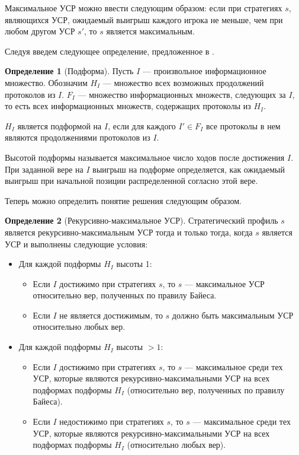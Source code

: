 \documentclass{mipt-thesis-bs}
\theoremstyle{plain}
\theoremstyle{definition}
\newtheorem{definition}{Определение}
\begin{document}
Максимальное УСР можно ввести следующим образом: если при стратегиях $s$, являющихся УСР, ожидаемый выигрыш каждого игрока не меньше, чем при любом другом УСР $s'$, то $s$ является максимальным.

Следуя \cite{chen2017noncoop} введем следующее определение, предложенное в \cite{kreps1982sequential}.
\begin{definition}[Подформа]
    Пусть $I$ --- произвольное информационное множество. Обозначим $H_I$ --- множество всех возможных продолжений протоколов из $I$. $F_I$ --- множество информационных множеств, следующих за $I$, то есть всех информационных множеств, содержащих протоколы из $H_I$.

    $H_I$ является подформой на $I$, если для каждого $I' \in F_I$ все протоколы в нем являются продолжениями протоколов из $I$.

    Высотой подформы называется максимальное число ходов после достижения $I$. При заданной вере на $I$ выигрыш на подформе определяется, как ожидаемый выигрыш при начальной позиции распределенной согласно этой вере.
\end{definition}

Теперь можно определить понятие решения следующим образом.

\begin{definition}[Рекурсивно-максимальное УСР]
   Стратегический профиль $s$ является рекурсивно-максимальным УСР тогда и только тогда, когда $s$ является УСР и выполнены следующие условия:
   \begin{itemize}
       \item Для каждой подформы $H_I$ высоты 1:
           \begin{itemize}
               \item Если $I$ достижимо при стратегиях $s$, то $s$ --- максимальное УСР относительно вер, полученных по правилу Байеса.
               \item Если $I$ не является достижимым, то $s$ должно быть максимальным УСР относительно любых вер.
            \end{itemize}
        \item Для каждой подформы $H_I$ высоты $>1$:
            \begin{itemize}
                \item Если $I$ достижимо при стратегиях $s$, то $s$ --- максимальное среди тех УСР, которые являются рекурсивно-максимальными УСР на всех подформах подформы $H_I$ (относительно вер, полученных по правилу Байеса).
                \item Если $I$ недостижимо при стратегиях $s$, то $s$ --- максимальное среди тех УСР, которые являются рекурсивно-максимальными УСР на всех подформах подформы $H_I$ (относительно любых вер).
            \end{itemize}
        \end{itemize}
\end{definition}
\end{document}
